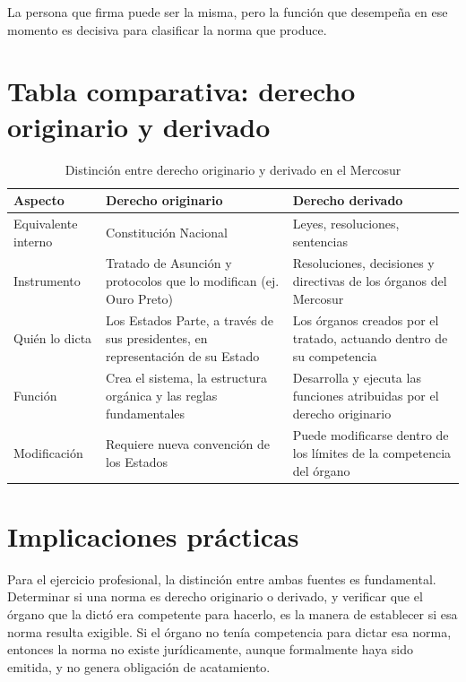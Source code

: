 \documentclass[12pt,oneside]{book}
\begin{document}
La persona que firma puede ser la misma, pero la función que desempeña en ese momento es decisiva para clasificar la norma que produce.

\section{Tabla comparativa: derecho originario y derivado}

\begin{table}[H]
\centering
\begin{tabularx}{\textwidth}{
    >{\raggedright\arraybackslash}p{}
    >{\raggedright\arraybackslash}X
    >{\raggedright\arraybackslash}X
}
\toprule
\textbf{Aspecto} & \textbf{Derecho originario} & \textbf{Derecho derivado} \\
\midrule
Equivalente interno & Constitución Nacional & Leyes, resoluciones, sentencias \\
Instrumento & Tratado de Asunción y protocolos que lo modifican (ej. Ouro Preto) & Resoluciones, decisiones y directivas de los órganos del Mercosur \\
Quién lo dicta & Los Estados Parte, a través de sus presidentes, en representación de su Estado & Los órganos creados por el tratado, actuando dentro de su competencia \\
Función & Crea el sistema, la estructura orgánica y las reglas fundamentales & Desarrolla y ejecuta las funciones atribuidas por el derecho originario \\
Modificación & Requiere nueva convención de los Estados & Puede modificarse dentro de los límites de la competencia del órgano \\
\bottomrule
\end{tabularx}
\caption{Distinción entre derecho originario y derivado en el Mercosur}
\end{table}

\section{Implicaciones prácticas}

Para el ejercicio profesional, la distinción entre ambas fuentes es fundamental. Determinar si una norma es derecho originario o derivado, y verificar que el órgano que la dictó era competente para hacerlo, es la manera de establecer si esa norma resulta exigible. Si el órgano no tenía competencia para dictar esa norma, entonces la norma no existe jurídicamente, aunque formalmente haya sido emitida, y no genera obligación de acatamiento.
\end{document}
